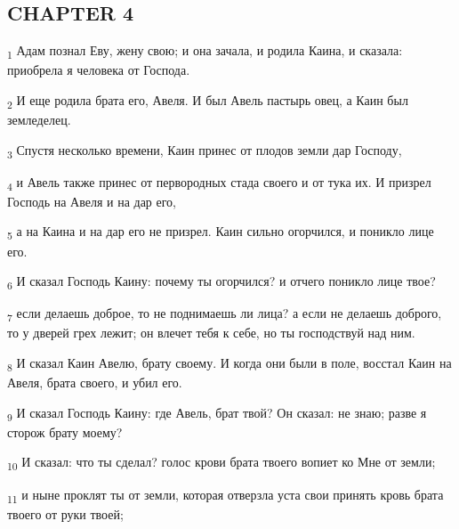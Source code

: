 \subsection{CHAPTER 4}
\begin{tcolorbox}
\textsubscript{1} Адам познал Еву, жену свою; и она зачала, и родила Каина, и сказала: приобрела я человека от Господа.
\end{tcolorbox}
\begin{tcolorbox}
\textsubscript{2} И еще родила брата его, Авеля. И был Авель пастырь овец, а Каин был земледелец.
\end{tcolorbox}
\begin{tcolorbox}
\textsubscript{3} Спустя несколько времени, Каин принес от плодов земли дар Господу,
\end{tcolorbox}
\begin{tcolorbox}
\textsubscript{4} и Авель также принес от первородных стада своего и от тука их. И призрел Господь на Авеля и на дар его,
\end{tcolorbox}
\begin{tcolorbox}
\textsubscript{5} а на Каина и на дар его не призрел. Каин сильно огорчился, и поникло лице его.
\end{tcolorbox}
\begin{tcolorbox}
\textsubscript{6} И сказал Господь Каину: почему ты огорчился? и отчего поникло лице твое?
\end{tcolorbox}
\begin{tcolorbox}
\textsubscript{7} если делаешь доброе, то не поднимаешь ли лица? а если не делаешь доброго, то у дверей грех лежит; он влечет тебя к себе, но ты господствуй над ним.
\end{tcolorbox}
\begin{tcolorbox}
\textsubscript{8} И сказал Каин Авелю, брату своему. И когда они были в поле, восстал Каин на Авеля, брата своего, и убил его.
\end{tcolorbox}
\begin{tcolorbox}
\textsubscript{9} И сказал Господь Каину: где Авель, брат твой? Он сказал: не знаю; разве я сторож брату моему?
\end{tcolorbox}
\begin{tcolorbox}
\textsubscript{10} И сказал: что ты сделал? голос крови брата твоего вопиет ко Мне от земли;
\end{tcolorbox}
\begin{tcolorbox}
\textsubscript{11} и ныне проклят ты от земли, которая отверзла уста свои принять кровь брата твоего от руки твоей;
\end{tcolorbox}
